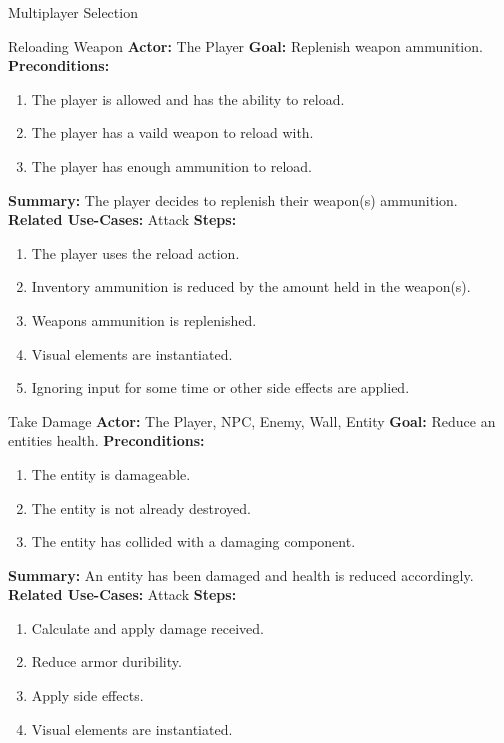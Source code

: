 \documentclass[12pt]{report}
\begin{document}
\begin{subsection}{Multiplayer Selection}
\begin{subsection}{Reloading Weapon}
\textbf{Actor:} The Player
\textbf{Goal:} Replenish weapon ammunition.
\textbf{Preconditions:}
\begin{enumerate}
	\item The player is allowed and has the ability to reload.
	\item The player has a vaild weapon to reload with.
	\item The player has enough ammunition to reload.
\end{enumerate}
\textbf{Summary:} The player decides to replenish their weapon(s) ammunition.
\textbf{Related Use-Cases:} Attack
\textbf{Steps:}
\begin{enumerate}
	\item The player uses the reload action.
	\item Inventory ammunition is reduced by the amount held in the weapon(s).
	\item Weapons ammunition is replenished.
	\item Visual elements are instantiated.
	\item Ignoring input for some time or other side effects are applied.
\end{enumerate}
\end{subsection}

\begin{subsection}{Take Damage}
\textbf{Actor:} The Player, NPC, Enemy, Wall, Entity
\textbf{Goal:} Reduce an entities health.
\textbf{Preconditions:}
\begin{enumerate}
	\item The entity is damageable.
	\item The entity is not already destroyed.
	\item The entity has collided with a damaging component.
\end{enumerate}
\textbf{Summary:} An entity has been damaged and health is reduced accordingly.
\textbf{Related Use-Cases:} Attack
\textbf{Steps:}
\begin{enumerate}
	\item Calculate and apply damage received.
	\item Reduce armor duribility.
	\item Apply side effects.
	\item Visual elements are instantiated.
\end{enumerate}
\end{subsection}






\end{subsection}
\end{document}
